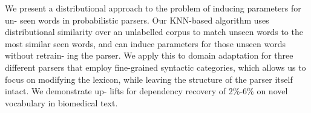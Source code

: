 We present a distributional approach to the problem of inducing parameters for un- seen words in probabilistic parsers. Our KNN-based algorithm uses distributional similarity over an unlabelled corpus to match unseen words to the most similar seen words, and can induce parameters for those unseen words without retrain- ing the parser. We apply this to domain adaptation for three different parsers that employ fine-grained syntactic categories, which allows us to focus on modifying the lexicon, while leaving the structure of the parser itself intact. We demonstrate up- lifts for dependency recovery of 2\%-6\% on novel vocabulary in biomedical text.
